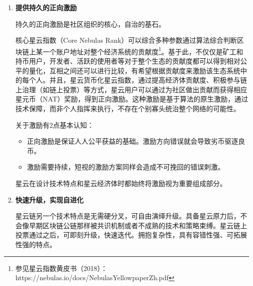 \begin{enumerate}
	\item \textbf{提供持久的正向激励}
	
	持久的正向激励是社区组织的核心，自治的基石。

	核心星云指数（Core Nebulas Rank）可以综合多种参数通过算法综合判断区块链上某一个账户地址对整个经济系统的贡献度\footnote{参见星云指数黄皮书（2018）：https://nebulas.io/docs/NebulasYellowpaperZh.pdf}。基于此，不仅仅是矿工和持币用户，开发者、活跃的使用者等对于整个生态的贡献度都可以得到相对公平的量化，互相之间还可以进行比较，有希望根据贡献度来激励该生态系统中的每个人。并且，星云货币化星云指数，通过提高经济体贡献度、积极参与链上治理（如链上投票）等方式，星云用户可以通过为社区做出贡献而获得相应星元币（NAT）奖励，得到正向激励。这种激励是基于算法的原生激励，通过技术保障，而非个人指挥来执行，不存在个别寡头统治整个网络的可能性。

	关于激励有2点基本认知：

	\begin{itemize}
		\item 正向激励是保证人人公平获益的基础。激励方向错误就会导致劣币驱逐良币。
		\item 激励需要持续，短视的激励方案同样会造成不可挽回的错误刺激。
	\end{itemize}

	星云在设计技术特点和星云经济体时都始终将激励视为重要组成部分。
	
	\item \textbf{快速升级，实现自进化}
	
	星云链另一个技术特点是无需硬分叉，可自由演绎升级。具备星云原力后，不会像早期区块链公链那样被共识机制或者不成熟的技术和策略束缚。星云链上投票通过之后，可即刻升级，快速迭代。拥抱复杂性，具有容错性强、可拓展性强的特点。
	
\end{enumerate}
